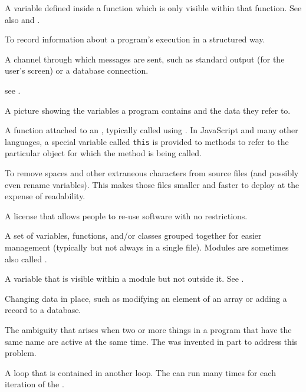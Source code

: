 \begin{description}
A variable defined inside a function which is only visible within that
function. See also  and
.

To record information about a program's execution in a structured way.

A channel through which  messages are sent, such as
standard output (for the user's screen) or a database connection.

see .

A picture showing the variables a program contains and the data they refer to.

A function attached to an , typically called using . In JavaScript and many other languages, a
special variable called \texttt{this} is provided to methods to refer to the
particular object for which the method is being called.

To remove spaces and other extraneous characters from source files (and
possibly even rename variables). This makes those files smaller and faster to
deploy at the expense of readability.

A license that allows people to re-use software with no restrictions.

A set of variables, functions, and/or classes grouped together for easier
management (typically but not always in a single file). Modules are sometimes
also called .

A variable that is visible within a module but not outside it. See
.

Changing data in place, such as modifying an element of an array or adding a
record to a database.

The ambiguity that arises when two or more things in a program that have the
same name are active at the same time. The  was
invented in part to address this problem.

A loop that is contained in another loop. The 
can run many times for each iteration of the .


\end{description}
